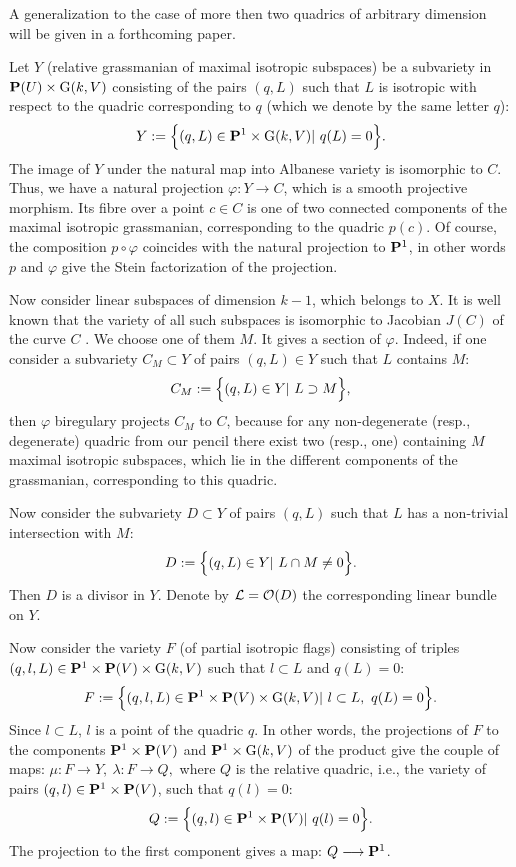 \documentclass[12pt]{article}
\begin{document}
A generalization to the case of more then two quadrics of arbitrary  dimension will be given in a forthcoming paper.



Let $Y$ (relative grassmanian of maximal isotropic subspaces)
be a subvariety in ${\bf P}(U)\times {\rm G}(k,V)$ consisting of the pairs $(q,L)$ such that $L$ is isotropic with respect to the quadric corresponding to $q$ (which we denote by the same letter $q$):
$$Y:=\Bigl\{ (q,L)\in{\bf P}^1\times {\rm G}(k,V)|\ q(L)=0
\Bigr\}.$$
The image of $Y$ under the natural map into Albanese variety is isomorphic to $C$. Thus, we have a natural projection 
$\varphi:Y\longrightarrow C$,
which is a smooth projective morphism. Its fibre over a point $c\in C$ is one of two connected components of the maximal isotropic grassmanian, corresponding to the quadric $p(c)$. Of course, the composition 
$p{\scriptstyle\circ}\varphi$
coincides with the natural projection to ${\bf P}^1$, in other words $p$ and $\varphi$ give the Stein factorization of the projection.

Now consider linear subspaces of dimension $k-1$, which belongs to $X$. It is well known that the variety of all such subspaces is isomorphic to Jacobian $J(C)$ of the curve $C$
 \cite{R1}. 
 We choose one of them $M$. It gives a section of $\varphi$. Indeed, if one consider a subvariety $C_M\subset Y$ of pairs $(q,L)\in Y$ such that $L$ contains $M$:
$$C_M:=\Bigl\{ (q,L)\in Y|\  L\supset M
\Bigr\},$$
then $\varphi$ biregulary projects $C_M$ to $C$, because for any non-degenerate (resp., degenerate) quadric from our pencil there exist two (resp., one) containing $M$ maximal isotropic subspaces, which lie in the different components of the grassmanian, corresponding to this quadric.

Now consider the subvariety $D\subset Y$ of pairs $(q,L)$ such that $L$ has a non-trivial intersection with $M$:
$$D:=\Bigl\{ (q,L)\in Y|\  L\cap M\not=0
\Bigr\}.$$
Then $D$ is a divisor in $Y$.
Denote by ${\cal L}={\cal O}(D)$ the corresponding linear bundle on $Y$. 

Now consider the variety $F$ (of partial isotropic flags) consisting of triples $(q,l,L)\in {\bf P}^1\times {\bf P}(V)\times{\rm G}(k,V)$ such that $l\subset L$ and $q(L)=0$:
$$F:=\Bigl\{ (q,l,L)\in {\bf P}^1\times {\bf P}(V)\times{\rm G}(k,V)|\  l\subset L,\ q(L)=0\Bigr\}.$$
Since $l\subset L$, $l$ is a point of the quadric $q$. In other words, the projections of $F$ to the components
${\bf P}^1\times{\bf P}(V)$ and ${\bf P}^1\times{\rm G}(k,V)$ of the product give the couple of maps: 
$\mu:F\longrightarrow Y,\ \lambda:F\longrightarrow Q,$ where $Q$ is the relative quadric, i.e., the variety of pairs $(q,l)\in{\bf P}^1\times{\bf P}(V)$, such that $q(l)=0$:
$$Q:=\Bigl\{ (q,l)\in {\bf P}^1\times {\bf P}(V)|\   q(l)=0\Bigr\}.$$
The projection to the first component gives a map: $Q\longrightarrow{\bf P}^1$.
\end{document}

